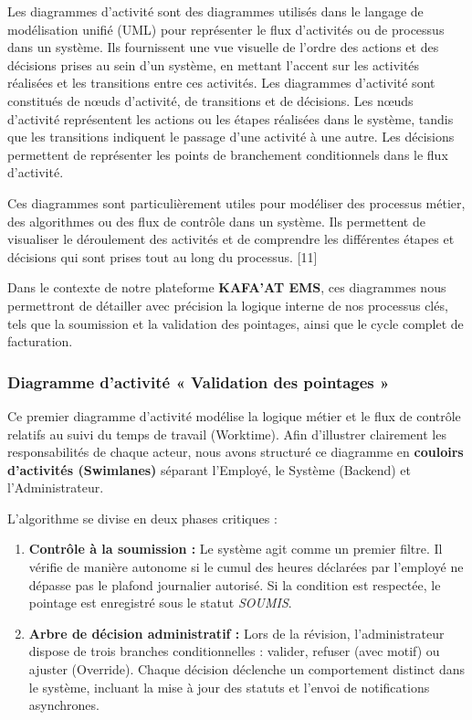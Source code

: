 \documentclass[12pt, a4paper, openany]{report}
\begin{document}
\vspace{-0.4cm}
Les diagrammes d'activité sont des diagrammes utilisés dans le langage de modélisation unifié (UML) pour représenter le flux d'activités ou de processus dans un système. Ils fournissent une vue visuelle de l'ordre des actions et des décisions prises au sein d'un système, en mettant l'accent sur les activités réalisées et les transitions entre ces activités. Les diagrammes d'activité sont constitués de nœuds d'activité, de transitions et de décisions. Les nœuds d'activité représentent les actions ou les étapes réalisées dans le système, tandis que les transitions indiquent le passage d'une activité à une autre. Les décisions permettent de représenter les points de branchement conditionnels dans le flux d'activité. 

Ces diagrammes sont particulièrement utiles pour modéliser des processus métier, des algorithmes ou des flux de contrôle dans un système. Ils permettent de visualiser le déroulement des activités et de comprendre les différentes étapes et décisions qui sont prises tout au long du processus. [11]

Dans le contexte de notre plateforme \textbf{KAFA'AT EMS}, ces diagrammes nous permettront de détailler avec précision la logique interne de nos processus clés, tels que la soumission et la validation des pointages, ainsi que le cycle complet de facturation.

\vspace{-0.4cm}
\subsubsection{Diagramme d'activité « Validation des pointages »}

\vspace{-0.4cm}
Ce premier diagramme d'activité modélise la logique métier et le flux de contrôle relatifs au suivi du temps de travail (Worktime). Afin d'illustrer clairement les responsabilités de chaque acteur, nous avons structuré ce diagramme en \textbf{couloirs d'activités (Swimlanes)} séparant l'Employé, le Système (Backend) et l'Administrateur.

L'algorithme se divise en deux phases critiques :
\begin{enumerate}[label=\textcolor{primaryBlue}{\arabic*.}, leftmargin=*]
    \item \textcolor{primaryBlue}{\textbf{Contrôle à la soumission :}} Le système agit comme un premier filtre. Il vérifie de manière autonome si le cumul des heures déclarées par l'employé ne dépasse pas le plafond journalier autorisé. Si la condition est respectée, le pointage est enregistré sous le statut \textit{SOUMIS}.
    \item \textcolor{primaryBlue}{\textbf{Arbre de décision administratif :}} Lors de la révision, l'administrateur dispose de trois branches conditionnelles : valider, refuser (avec motif) ou ajuster (Override). Chaque décision déclenche un comportement distinct dans le système, incluant la mise à jour des statuts et l'envoi de notifications asynchrones.
\end{enumerate}
\end{document}
